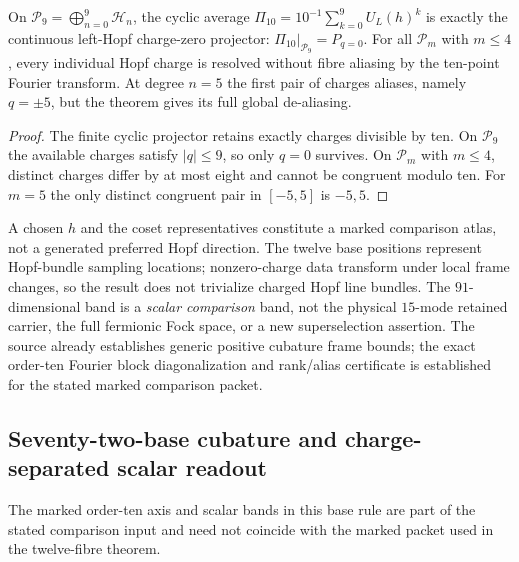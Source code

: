 \documentclass[12pt,a4paper]{article}
\begin{document}
\begin{corollary}
\label{p2d:cor:cc14-charge-filter}
On $\mathcal P_9=\bigoplus_{n=0}^9\mathcal H_n$, the cyclic average
$\Pi_{10}=10^{-1}\sum_{k=0}^{9}U_L(h)^k$ is exactly the continuous
left-Hopf charge-zero projector: $\Pi_{10}|_{\mathcal P_9}=P_{q=0}$.
For all $\mathcal P_m$ with $m\le4$, every individual Hopf charge
is resolved without fibre aliasing by the ten-point Fourier transform.
At degree $n=5$ the first pair of charges aliases, namely $q=\pm5$,
but the theorem gives its full global de-aliasing.
\end{corollary}
\begin{proof}
The finite cyclic projector retains exactly charges divisible by ten.
On $\mathcal P_9$ the available charges satisfy $|q|\le9$, so only
$q=0$ survives.  On $\mathcal P_m$ with $m\le4$, distinct charges
differ by at most eight and cannot be congruent modulo ten.
For $m=5$ the only distinct congruent pair in $[-5,5]$ is $-5,5$.
\end{proof}

\begin{remark}
A chosen $h$ and the coset representatives constitute a marked
comparison atlas, not a generated preferred Hopf direction.
The twelve base positions represent Hopf-bundle sampling locations;
nonzero-charge data transform under local frame changes, so the result
does not trivialize charged Hopf line bundles.  The $91$-dimensional
band is a \emph{scalar comparison} band, not the physical $15$-mode
retained carrier, the full fermionic Fock space, or a new
superselection assertion.  The source already establishes generic
positive cubature frame bounds; the exact order-ten Fourier block diagonalization and rank/alias
certificate is established for the stated marked comparison packet.
\end{remark}


\subsection{Seventy-two-base cubature and charge-separated scalar readout}
\label{p2d:sec:cc20-72-hopf-sampler}
The marked order-ten axis and scalar bands in this base rule are
part of the stated comparison input and need not coincide with the
marked packet used in the twelve-fibre theorem.
\end{document}
